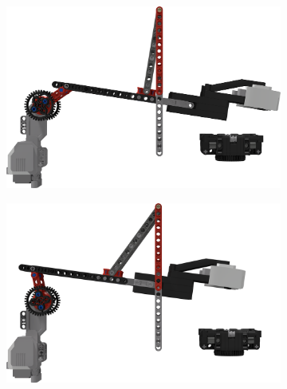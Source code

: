 \documentclass{report}
\begin{document}
   	\begin{figure}[H]
    	\centering
    	\begin{subfigure}[b]{0.25\textwidth}
    		\includegraphics[width=\textwidth]{Resources/Images/rdrXMoveArmLowered.png}
    		\caption{}
    		\label{fig:rdrXMoveArmLowered}
    	\end{subfigure}
    	\hspace{10mm}
    	\begin{subfigure}[b]{0.25\textwidth}
    		\includegraphics[width=\textwidth]{Resources/Images/rdrXMoveArmPulling.png}
    		\caption{}
    		\label{fig:rdrXMoveArmPulling}
    	\end{subfigure}
    	\hspace{10mm}
    	\begin{subfigure}[b]{0.25\textwidth}

\end{subfigure}
\end{figure}
\end{document}
